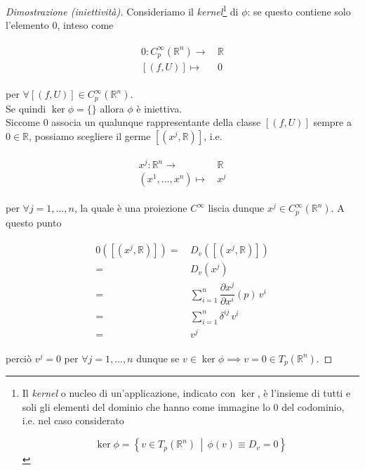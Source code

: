 \begin{proof}[Dimostrazione (iniettività)]
	Consideriamo il \textit{kernel}\footnote{%
	Il \textit{kernel} o nucleo di un'applicazione, indicato con $ \ker $, è l'insieme di tutti e soli gli elementi del dominio che hanno come immagine lo $ 0 $ del codominio, i.e. nel caso considerato
	
	\begin{equation}
		\ker \phi = \left\{ v \in T_{p}(\mathbb{R}^{n}) \, \middle| \, \phi(v) \equiv D_{v} = 0 \right\}
	\end{equation}%
	} di $ \phi $: se questo contiene solo l'elemento $ 0 $, inteso come
	
	\begin{align}
		\begin{split}
			0 : C_{p}^{\infty}(\mathbb{R}^{n}) \to& \, \mathbb{R}\\
			[(f,U)] \mapsto& \, 0
		\end{split}
	\end{align}

	per $ \forall [(f,U)] \in C_{p}^{\infty}(\mathbb{R}^{n}) $.\\
	Se quindi $ \ker \phi = \{\} $ allora $ \phi $ è iniettiva.\\
	Siccome $ 0 $ associa un qualunque rappresentante della classe $ [(f,U)] $ sempre a $ 0 \in \mathbb{R} $, possiamo scegliere il germe $ [(x^{j},\mathbb{R})] $, i.e.
	
	\begin{align}
		\begin{split}
			x^{j} : \mathbb{R}^{n} \to& \, \mathbb{R}\\
			(x^{1},\dots,x^{n}) \mapsto& \, x^{j}
		\end{split}
	\end{align}

	per $ \forall j=1,\dots,n $, la quale è una proiezione $ C^{\infty} $ liscia dunque $ x^{j} \in C_{p}^{\infty}(\mathbb{R}^{n}) $. A questo punto
	
	\begin{align}
		\begin{split}
			0([(x^{j},\mathbb{R})]) =& \, D_{v} ([(x^{j},\mathbb{R})])\\
			=& \, D_{v} (x^{j})\\
			=& \, \sum_{i=1}^{n} \dfrac{\partial x^{j}}{\partial x^{i}} (p) \, v^{i}\\
			=& \, \sum_{i=1}^{n} \delta^{ij} \, v^{i}\\
			=& \, v^{j}
		\end{split}
	\end{align}

	perciò $ v^{j} = 0 $ per $ \forall j=1,\dots,n $ dunque se $ v \in \ker \phi \implies v = 0 \in T_{p}(\mathbb{R}^{n}) $.
\end{proof}

